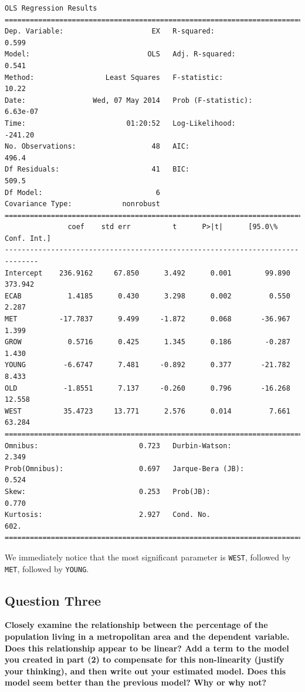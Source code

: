 \documentclass[10pt]{article}\usepackage[]{graphicx}\usepackage[]{xcolor}
\begin{document}
            \begin{Verbatim}[commandchars=\\\{\}]
                          OLS Regression Results                            
==============================================================================
Dep. Variable:                     EX   R-squared:                       0.599
Model:                            OLS   Adj. R-squared:                  0.541
Method:                 Least Squares   F-statistic:                     10.22
Date:                Wed, 07 May 2014   Prob (F-statistic):           6.63e-07
Time:                        01:20:52   Log-Likelihood:                -241.20
No. Observations:                  48   AIC:                             496.4
Df Residuals:                      41   BIC:                             509.5
Df Model:                           6                                         
Covariance Type:            nonrobust                                         
==============================================================================
               coef    std err          t      P>|t|      [95.0\% Conf. Int.]
------------------------------------------------------------------------------
Intercept    236.9162     67.850      3.492      0.001        99.890   373.942
ECAB           1.4185      0.430      3.298      0.002         0.550     2.287
MET          -17.7837      9.499     -1.872      0.068       -36.967     1.399
GROW           0.5716      0.425      1.345      0.186        -0.287     1.430
YOUNG         -6.6747      7.481     -0.892      0.377       -21.782     8.433
OLD           -1.8551      7.137     -0.260      0.796       -16.268    12.558
WEST          35.4723     13.771      2.576      0.014         7.661    63.284
==============================================================================
Omnibus:                        0.723   Durbin-Watson:                   2.349
Prob(Omnibus):                  0.697   Jarque-Bera (JB):                0.524
Skew:                           0.253   Prob(JB):                        0.770
Kurtosis:                       2.927   Cond. No.                         602.
==============================================================================
\end{Verbatim}
        
    We immediately notice that the most significant parameter is \texttt{WEST}, followed by \texttt{MET}, followed by
    \texttt{YOUNG}.

    \subsection*{Question Three}
    \textbf{Closely examine the relationship between the percentage of the population living in a metropolitan area and the
    dependent variable. Does this relationship appear to be linear? Add a term to the model you created in part (2) to
    compensate for this non-linearity (justify your thinking), and then write out your estimated model. Does this model
    seem better than the previous model?  Why or why not?}\newline
\end{document}
